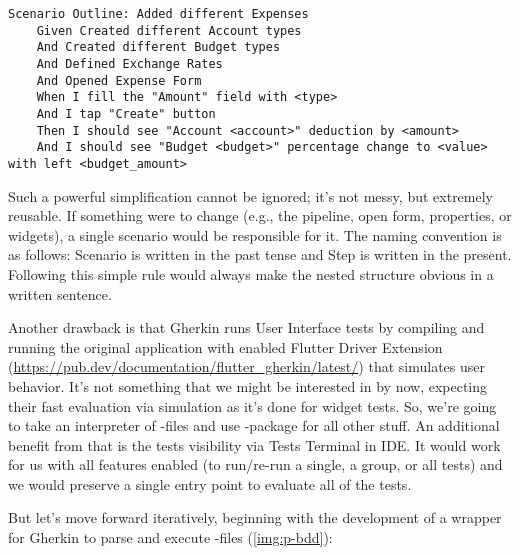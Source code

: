 \begin{lstlisting}[language=cucumber]
  Scenario Outline: Added different Expenses
    Given Created different Account types
    And Created different Budget types
    And Defined Exchange Rates
    And Opened Expense Form
    When I fill the "Amount" field with <type>
    And I tap "Create" button
    Then I should see "Account <account>" deduction by <amount>
    And I should see "Budget <budget>" percentage change to <value> with left <budget_amount>
\end{lstlisting}

\noindent Such a powerful simplification cannot be ignored; it's not messy, but extremely reusable. If something were to 
change (e.g., the pipeline, open form, properties, or widgets), a single scenario would be responsible for it. The 
naming convention is as follows: Scenario is written in the past tense and Step is written in the present. Following 
this simple rule would always make the nested structure obvious in a written sentence.

Another drawback is that Gherkin runs User Interface tests by compiling and running the original application with 
enabled Flutter Driver Extension 
(\href{https://pub.dev/documentation/flutter_gherkin/latest/}{https://pub.dev/documentation/flutter\_gherkin/latest/}) 
that simulates user behavior. It's not something that we might be interested in by now, expecting their fast evaluation 
via simulation as it's done for widget tests. So, we're going to take an interpreter of -files and use 
-package for all other stuff. An additional benefit from that is the tests visibility via Tests 
Terminal in IDE. It would work for us with all features enabled (to run/re-run a single, a group, or all tests) and 
we would preserve a single entry point to evaluate all of the tests.


\noindent But let's move forward iteratively, beginning with the development of a wrapper for Gherkin to parse and 
execute -files (\cref{img:p-bdd}):

